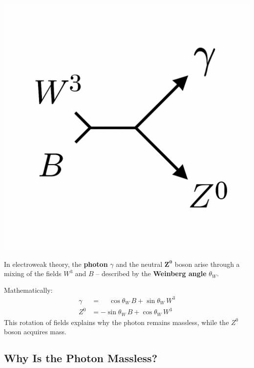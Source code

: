 \vspace{1em}
\begin{tcolorbox}[didaktikbox, title=From \(W^3\) and \(B\) to the Photon]
	\label{box:weinberg_mischung}
	\small
	\begin{minipage}{0.35\textwidth}
		\centering
		\includegraphics[width=\linewidth]{bilder/weinberg_mischung.png}
	\end{minipage}%
	\begin{minipage}{0.63\textwidth}
		In electroweak theory, the \textbf{photon} \(\gamma\) and the neutral 
		\(\mathbf{Z^0}\) boson arise through a mixing of the fields \(W^3\) and \(B\) 
		– described by the \textbf{Weinberg angle} \(\theta_W\).  
		\vspace{0.3em}
		
		Mathematically:
		\[
		\begin{aligned}
			\gamma &= \phantom{-}\cos\theta_W \, B + \sin\theta_W \, W^3 \\
			Z^0    &= -\sin\theta_W \, B + \cos\theta_W \, W^3
		\end{aligned}
		\]
		This rotation of fields explains why the photon remains massless, while 
		the \(Z^0\) boson acquires mass.
	\end{minipage}
\end{tcolorbox}
\newpage
\noindent
\subsection{Why Is the Photon Massless?}

